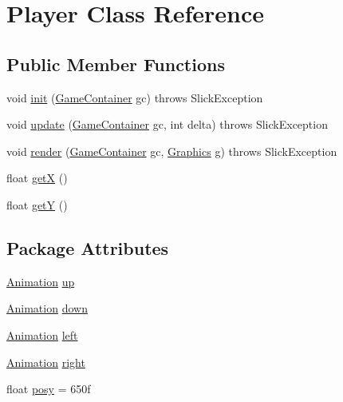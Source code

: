 \hypertarget{class_player}{}\section{Player Class Reference}
\label{class_player}
\subsection*{Public Member Functions}
\begin{DoxyCompactItemize}
\item 
void \mbox{\hyperlink{class_player_a58d8bd636240e41ec1db97774547e1c2}{init}} (\mbox{\hyperlink{classorg_1_1newdawn_1_1slick_1_1_game_container}{Game\+Container}} gc)  throws Slick\+Exception 
\item 
void \mbox{\hyperlink{class_player_a07bdda48d9f22aac28ddd4b5ffa2f20d}{update}} (\mbox{\hyperlink{classorg_1_1newdawn_1_1slick_1_1_game_container}{Game\+Container}} gc, int delta)  throws Slick\+Exception          
\item 
void \mbox{\hyperlink{class_player_a79907712a1c54d014a17dd206aa1921a}{render}} (\mbox{\hyperlink{classorg_1_1newdawn_1_1slick_1_1_game_container}{Game\+Container}} gc, \mbox{\hyperlink{classorg_1_1newdawn_1_1slick_1_1_graphics}{Graphics}} g)  throws Slick\+Exception      
\item 
float \mbox{\hyperlink{class_player_aca68294689ea1609fbf58eb7e2a6850f}{getX}} ()
\item 
float \mbox{\hyperlink{class_player_a39e72ac5911ce17465168e64995e07d9}{getY}} ()
\end{DoxyCompactItemize}
\subsection*{Package Attributes}
\begin{DoxyCompactItemize}
\item 
\mbox{\hyperlink{classorg_1_1newdawn_1_1slick_1_1_animation}{Animation}} \mbox{\hyperlink{class_player_a0c55658c20ec3c38f7f576cc2cf82159}{up}}
\item 
\mbox{\hyperlink{classorg_1_1newdawn_1_1slick_1_1_animation}{Animation}} \mbox{\hyperlink{class_player_afd6877026455f117ab11a7dff0ebc66b}{down}}
\item 
\mbox{\hyperlink{classorg_1_1newdawn_1_1slick_1_1_animation}{Animation}} \mbox{\hyperlink{class_player_a8498ed1f7da9f5eece81ff568b7cfb1e}{left}}
\item 
\mbox{\hyperlink{classorg_1_1newdawn_1_1slick_1_1_animation}{Animation}} \mbox{\hyperlink{class_player_a64f2b14c132dcace9efb06b2cfb499b2}{right}}
\item 
float \mbox{\hyperlink{class_player_afc459a9ddc8482a3905bf40e410084a8}{posy}} = 650f
\end{DoxyCompactItemize}
